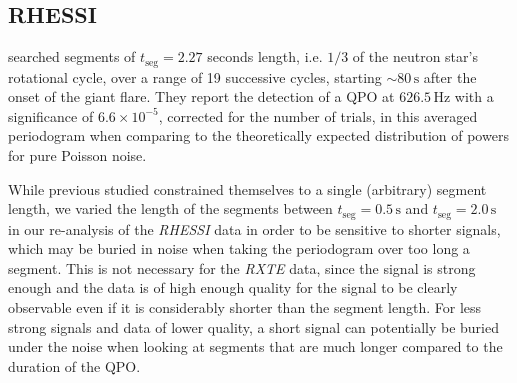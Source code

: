 \documentclass{emulateapj}
\begin{document}
\subsection{RHESSI}
\label{sec:rhessi_results}

\citealt{Watts06} searched segments of $t_{\mathrm{seg}} = 2.27$ seconds length, i.e. $1/3$ of the neutron star's rotational cycle, over a range of 19 successive cycles, starting $\sim 80 \, \mathrm{s}$ after the onset of the giant flare. They report the detection of a QPO at $626.5 \, \mathrm{Hz}$ with a significance of $6.6 \times 10^{-5}$, corrected for the number of trials, in this averaged periodogram when comparing to the theoretically expected distribution of powers for pure Poisson noise.

While previous studied constrained themselves to a single (arbitrary) segment length, we varied the length of the segments between $t_{\mathrm{seg}} = 0.5 \, \mathrm{s}$ and $t_{\mathrm{seg}} = 2.0 \, \mathrm{s}$ in our re-analysis of the {\it RHESSI} data in order to be sensitive to shorter signals, which may be buried in noise when taking the periodogram over too long a segment. This is not necessary for the {\it RXTE} data, since the signal is strong enough and the data is of high enough quality for the signal to be clearly observable even if it is considerably shorter than the segment length. For less strong signals and data of lower quality, a short signal can potentially be buried under the noise when looking at segments that are much longer compared to the duration of the QPO. 
\end{document}
